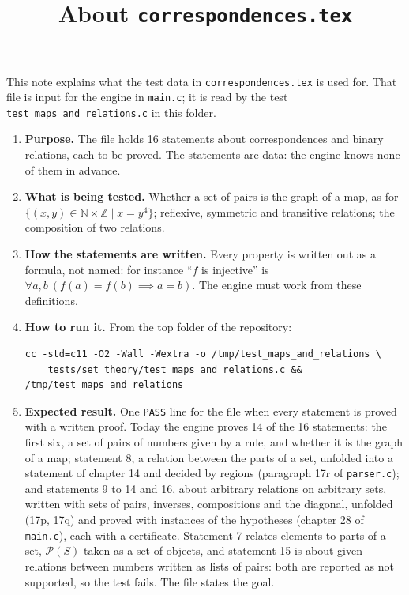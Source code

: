 \documentclass[11pt,a4paper]{article}
\title{About \texttt{correspondences.tex}}
\author{}
\date{}
\begin{document}
\maketitle
This note explains what the test data in \texttt{correspondences.tex} is used for. That file is input for the engine in \texttt{main.c}; it is read by the test \texttt{test\_maps\_and\_relations.c} in this folder.

\begin{enumerate}
\item \textbf{Purpose.} The file holds 16 statements about correspondences and binary relations, each to be proved. The statements are data: the engine knows none of them in advance.

\item \textbf{What is being tested.} Whether a set of pairs is the graph of a map, as for $\{(x, y) \in \mathbb{N} \times \mathbb{Z} \mid x = y^{4}\}$; reflexive, symmetric and transitive relations; the composition of two relations.

\item \textbf{How the statements are written.} Every property is written out as a formula, not named: for instance ``$f$ is injective'' is $\forall a, b\ (f(a) = f(b) \implies a = b)$. The engine must work from these definitions.

\item \textbf{How to run it.} From the top folder of the repository:
\begin{verbatim}
cc -std=c11 -O2 -Wall -Wextra -o /tmp/test_maps_and_relations \
    tests/set_theory/test_maps_and_relations.c && /tmp/test_maps_and_relations
\end{verbatim}

\item \textbf{Expected result.} One \texttt{PASS} line for the file when every statement is proved with a written proof. Today the engine proves 14 of the 16 statements: the first six, a set of pairs of numbers given by a rule, and whether it is the graph of a map; statement 8, a relation between the parts of a set, unfolded into a statement of chapter 14 and decided by regions (paragraph 17r of \texttt{parser.c}); and statements 9 to 14 and 16, about arbitrary relations on arbitrary sets, written with sets of pairs, inverses, compositions and the diagonal, unfolded (17p, 17q) and proved with instances of the hypotheses (chapter 28 of \texttt{main.c}), each with a certificate. Statement 7 relates elements to parts of a set, $\mathcal{P}(S)$ taken as a set of objects, and statement 15 is about given relations between numbers written as lists of pairs: both are reported as not supported, so the test fails. The file states the goal.
\end{enumerate}
\end{document}
